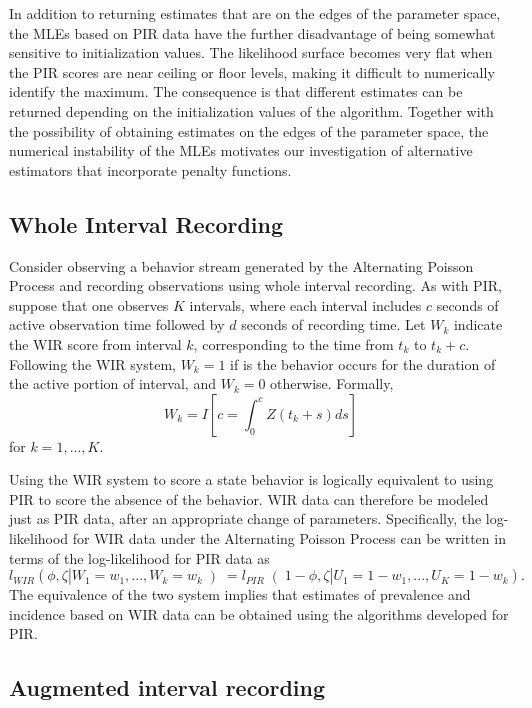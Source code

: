 \documentclass[man, noextraspace, floatsintext]{apa6}\usepackage[]{graphicx}\usepackage[]{color}
\begin{document}
In addition to returning estimates that are on the edges of the parameter space, the MLEs based on PIR data have the further disadvantage of being somewhat sensitive to initialization values. 
The likelihood surface becomes very flat when the PIR scores are near ceiling or floor levels, making it difficult to numerically identify the maximum. 
The consequence is that different estimates can be returned depending on the initialization values of the algorithm. 
Together with the possibility of obtaining estimates on the edges of the parameter space, the numerical instability of the MLEs motivates our investigation of alternative estimators that incorporate penalty functions.  

\subsection{Whole Interval Recording}
\label{sec:WIR}

Consider observing a behavior stream generated by the Alternating Poisson Process and recording observations using whole interval recording. 
As with PIR, suppose that one observes $K$ intervals, where each interval includes $c$ seconds of active observation time followed by $d$ seconds of recording time. 
Let $W_k$ indicate the WIR score from interval $k$, corresponding to the time from $t_k$ to $t_k + c$. 
Following the WIR system, $W_k = 1$ if is the behavior occurs for the duration of the active portion of interval, and $W_k = 0$ otherwise. 
Formally, 
\begin{equation}
W_k = I\left[ c = \int_0^c Z\left(t_k + s \right) ds\right]
\end{equation}
for $k = 1,...,K$. 

Using the WIR system to score a state behavior is logically equivalent to using PIR to score the absence of the behavior. 
WIR data can therefore be modeled just as PIR data, after an appropriate change of parameters. 
Specifically, the log-likelihood for WIR data under the Alternating Poisson Process can be written in terms of the log-likelihood for PIR data as
\begin{equation}
l_{WIR}\left(\phi, \zeta | W_1 = w_1,...,W_k = w_k \left) = l_{PIR}\right(1 - \phi, \zeta | U_1 = 1 - w_1,...,U_K = 1 - w_k\right).
\end{equation}
The equivalence of the two system implies that estimates of prevalence and incidence based on WIR data can be obtained using the algorithms developed for PIR. 


\subsection{Augmented interval recording}
\label{subsec:AIR}
\end{document}
